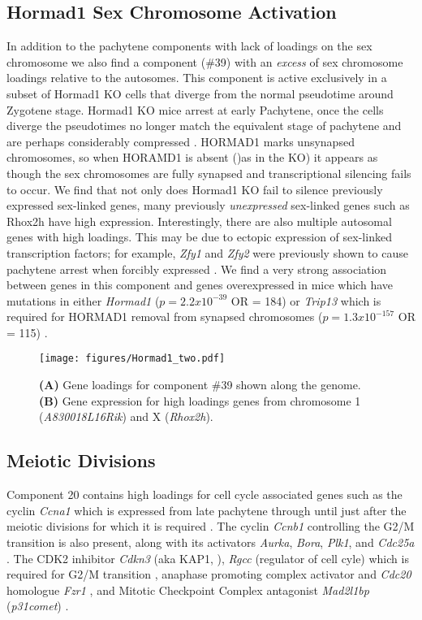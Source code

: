 \subsection{Hormad1 Sex Chromosome Activation}
In addition to the pachytene components with lack of loadings on the sex chromosome we also find a component (\#39) with an \textit{excess} of sex chromosome loadings relative to the autosomes. This component is active exclusively in a subset of Hormad1 KO cells that diverge from the normal pseudotime around Zygotene stage. Hormad1 KO mice arrest at early Pachytene, once the cells diverge the pseudotimes no longer match the equivalent stage of pachytene and are perhaps considerably compressed \parencite{Shin2010Hormad1}. HORMAD1 marks unsynapsed chromosomes, so when HORAMD1 is absent ()as in the KO) it appears as though the sex chromosomes are fully synapsed and transcriptional silencing fails to occur. We find that not only does Hormad1 KO fail to silence previously expressed sex-linked genes, many previously \textit{unexpressed} sex-linked genes such as Rhox2h have high expression. Interestingly, there are also multiple autosomal genes with high loadings. This may be due to ectopic expression of sex-linked transcription factors; for example, \textit{Zfy1} and \textit{Zfy2} were previously shown to cause pachytene arrest when forcibly expressed \cite{Royo2010Evidence}. We find a very strong association between genes in this component and genes overexpressed in mice which have mutations in either \textit{Hormad1} ($p = 2.2x10^{-39}$ OR = 184) or \textit{Trip13} which is required for HORMAD1 removal from synapsed chromosomes ($p = 1.3x10^{-157}$ OR = 115) \cite{Ortega2016Surveillance, Wojtasz2009Mouse}.

\begin{figure}[H]
	\centering
	\texttt{[image: figures/Hormad1\_two.pdf]}
	\caption{
		\textbf{(A)} Gene loadings for component \#39 shown along the genome.
		\textbf{(B)} Gene expression for high loadings genes from chromosome 1 (\textit{A830018L16Rik}) and X (\textit{Rhox2h}).
	}
	\label{fig:Hormad1}
\end{figure}

\subsection{Meiotic Divisions}
Component 20 contains high loadings for cell cycle associated genes such as the cyclin \textit{Ccna1} which is expressed from late pachytene through until just after the meiotic divisions \parencite{Sweeney1996distinct} for which it is required \parencite{Liu1998Cyclin}. The cyclin \textit{Ccnb1} controlling the G2/M transition is also present, along with its activators \textit{Aurka}, \textit{Bora}, \textit{Plk1}, and \textit{Cdc25a} \parencite[Reviewed in ]{Joukov2018AuroraPLK1}. The CDK2 inhibitor \textit{Cdkn3} (aka KAP1, \parencite{Poon1995Dephosphorylation}), \textit{Rgcc} (regulator of cell cyle) which is required for G2/M transition \parencite{Saigusa2007RGC32}, anaphase promoting complex activator and \textit{Cdc20} homologue \textit{Fzr1} \parencite{Holt2014APC}, and Mitotic Checkpoint Complex antagonist \textit{Mad2l1bp} (\textit{p31comet}) \parencite{Habu2002Identification}.

